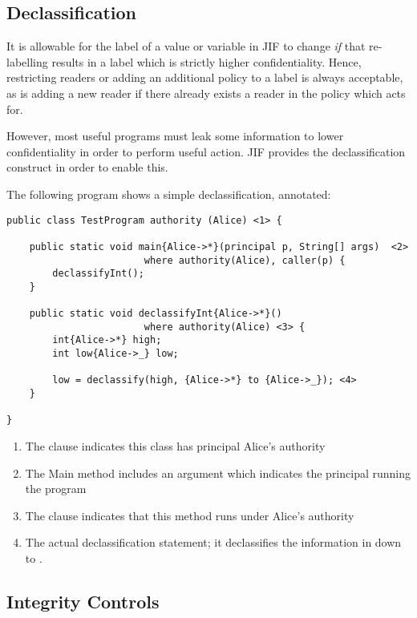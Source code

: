 \subsection{Declassification}

It is allowable for the label of a value or variable in JIF to change \textit{if} that re-labelling results in a label which is strictly higher confidentiality. Hence, restricting readers or adding an additional policy to a label is always acceptable, as is adding a new reader  if there already exists a reader in the policy which  acts for.

However, most useful programs must leak some information to lower confidentiality in order to perform useful action. JIF provides the declassification construct in order to enable this.

The following program shows a simple declassification, annotated:

\begin{verbatim}
public class TestProgram authority (Alice) <1> {
	
	public static void main{Alice->*}(principal p, String[] args)  <2>
						where authority(Alice), caller(p) {
		declassifyInt();
	}
	
	public static void declassifyInt{Alice->*}() 
						where authority(Alice) <3> {
		int{Alice->*} high;
		int low{Alice->_} low;
		
		low = declassify(high, {Alice->*} to {Alice->_}); <4>
	}

}
\end{verbatim}

\begin{enumerate}
	
	\item The  clause indicates this class has principal Alice's authority
	
	\item The Main method includes an argument which indicates the principal running the program
	
	\item The  clause indicates that this method runs under Alice's authority
	
	\item The actual declassification statement; it declassifies the information in  down to .
	
\end{enumerate}

\subsection{Integrity Controls}

